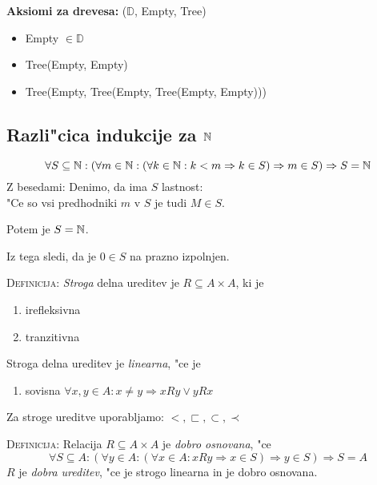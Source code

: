 \textbf{Aksiomi za drevesa:} ($\mathbb{D}$, Empty, Tree)
\begin{itemize}
	\item  Empty $\in \mathbb{D}$
	\item Tree(Empty, Empty)
	\item Tree(Empty, Tree(Empty, Tree(Empty, Empty)))
\end{itemize}

\subsection{Razli"cica indukcije za $\mathbb{N}$}
\begin{equation*}
\forall S \subseteq \mathbb{N}: (\forall m \in \mathbb{N}: (\forall k \in \mathbb{N}: k < m \Rightarrow k \in S) \Rightarrow m \in S) \Rightarrow S = \mathbb{N}
\end{equation*}
Z besedami: Denimo, da ima $S$ lastnost:\\
"Ce so vsi predhodniki $m$ v $S$ je tudi $M \in S$.

Potem je $S = \mathbb{N}$.

Iz tega sledi, da je $0 \in S$ na prazno izpolnjen.

\textsc{Definicija:} \emph{Stroga} delna ureditev je $R \subseteq A \times A$, ki je 
\begin{enumerate}
	\item irefleksivna
	\item tranzitivna
\end{enumerate}
Stroga delna ureditev je \emph{linearna}, "ce je
\begin{enumerate}[3.]
	\item sovisna $\forall x, y \in A: x \neq y \Rightarrow x R y \lor y R x$
\end{enumerate}
Za stroge ureditve uporabljamo: $<, \sqsubset, \subset, \prec$

\textsc{Definicija:} Relacija $R \subseteq A \times A$ je \emph{dobro osnovana}, "ce
\begin{equation*}
\forall S \subseteq A: (\forall y \in A: (\forall x \in A: x R y \Rightarrow x \in S) \Rightarrow y \in S) \Rightarrow S = A
\end{equation*}
$R$ je \emph{dobra ureditev}, "ce je strogo linearna in je dobro osnovana.


